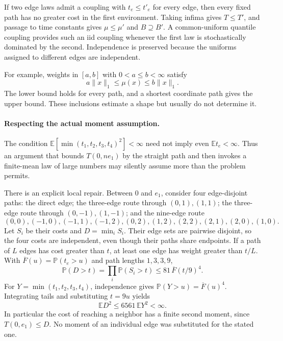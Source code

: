\documentclass[11pt]{article}
\begin{document}
If two edge laws admit a coupling with $t_e\le t'_e$ for every edge, then every fixed path has no greater cost in the first environment. Taking infima gives $T\le T'$, and passage to time constants gives $\mu\le\mu'$ and $B\supseteq B'$. A common-uniform quantile coupling provides such an iid coupling whenever the first law is stochastically dominated by the second. Independence is preserved because the uniforms assigned to different edges are independent.

For example, weights in $[a,b]$ with $0<a\le b<\infty$ satisfy
\[
 a\|x\|_1\le\mu(x)\le b\|x\|_1.
 \tag{422.5}
\]
The lower bound holds for every path, and a shortest coordinate path gives the upper bound. These inclusions estimate a shape but usually do not determine it.

\paragraph{Respecting the actual moment assumption.}
The condition $\mathbb E[\min(t_1,t_2,t_3,t_4)^2]<\infty$ need not imply even $\mathbb E t_e<\infty$. Thus an argument that bounds $T(0,ne_1)$ by the straight path and then invokes a finite-mean law of large numbers may silently assume more than the problem permits.

There is an explicit local repair. Between $0$ and $e_1$, consider four edge-disjoint paths: the direct edge; the three-edge route through $(0,1),(1,1)$; the three-edge route through $(0,-1),(1,-1)$; and the nine-edge route
\[
 (0,0),(-1,0),(-1,1),(-1,2),(0,2),(1,2),
 (2,2),(2,1),(2,0),(1,0).
\]
Let $S_i$ be their costs and $D=\min_i S_i$. Their edge sets are pairwise disjoint, so the four costs are independent, even though their paths share endpoints. If a path of $L$ edges has cost greater than $t$, at least one edge has weight greater than $t/L$. With $\overline F(u)=\mathbb P(t_e>u)$ and path lengths $1,3,3,9$,
\[
 \mathbb P(D>t)=\prod_i\mathbb P(S_i>t)
 \le81\,\overline F(t/9)^4.
 \tag{422.6}
\]
For $Y=\min(t_1,t_2,t_3,t_4)$, independence gives $\mathbb P(Y>u)=\overline F(u)^4$. Integrating tails and substituting $t=9u$ yields
\[
 \mathbb E D^2\le6561\,\mathbb E Y^2<\infty.
 \tag{422.7}
\]
In particular the cost of reaching a neighbor has a finite second moment, since $T(0,e_1)\le D$. No moment of an individual edge was substituted for the stated one.
\end{document}
